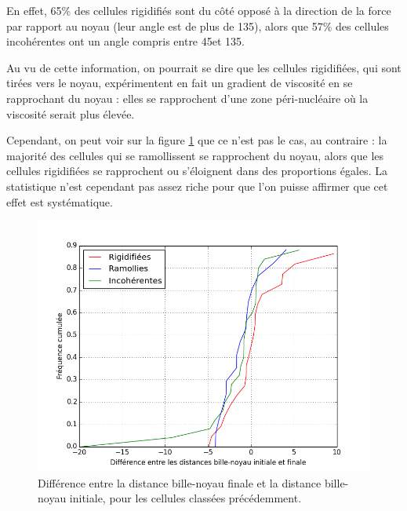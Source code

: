 En effet, 65\% des cellules rigidifiés sont du côté opposé à la direction de la force par rapport au noyau (leur angle est de plus de 135\degres ), alors que 57\% des cellules incohérentes ont un angle compris entre 45\degres et 135\degres . 

Au vu de cette information, on pourrait se dire que les cellules rigidifiées, qui sont tirées vers le noyau, expérimentent en fait un gradient de viscosité en se rapprochant du noyau : elles se rapprochent d'une zone péri-nucléaire où la viscosité serait plus élevée. 

Cependant, on peut voir sur la figure \ref{DBN} que ce n'est pas le cas, au contraire : la majorité des cellules qui se ramollissent se rapprochent du noyau, alors que les cellules rigidifiées se rapprochent ou s'éloignent dans des proportions égales. La statistique n'est cependant pas assez riche pour que l'on puisse affirmer que cet effet est systématique.

\begin{figure}
\includegraphics[scale=0.5]{Figures/Evolution_DBN.png}
\caption{Différence entre la distance bille-noyau finale et la distance bille-noyau initiale, pour les cellules classées précédemment. \label{DBN}}
\end{figure}

 
 
 
%
